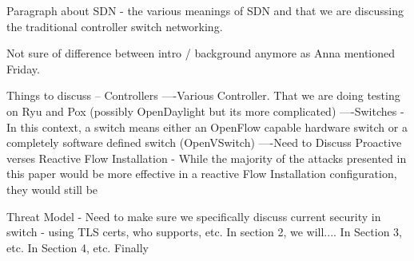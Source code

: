 
Paragraph about SDN - the various meanings of SDN and that we are discussing the traditional controller switch networking.

Not sure of difference between intro / background anymore as Anna mentioned Friday.

Things to discuss
-- Controllers
----Various Controller. That we are doing testing on Ryu and Pox (possibly OpenDaylight but its more complicated)
----Switches - In this context, a switch means either an OpenFlow capable hardware switch or a completely software defined switch (OpenVSwitch)
----Need to Discuss Proactive verses Reactive Flow Installation - While the majority of the attacks presented in this paper would be more effective in a reactive Flow Installation configuration, they would still be 

Threat Model
- Need to make sure we specifically discuss current security in switch - using TLS certs, who supports, etc.
In section 2, we will.... In Section 3, etc. In Section 4, etc. Finally
